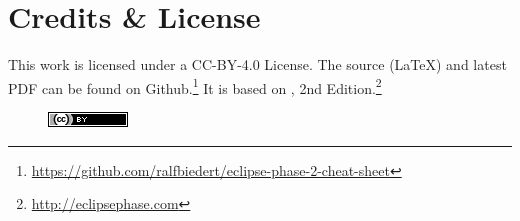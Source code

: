 \section*{Credits \& License}


\begin{itemize}
    \itembox This work is licensed under a CC-BY-4.0 License.
    \itembox The source (LaTeX) and latest PDF can be found on Github.\footnote{\url{https://github.com/ralfbiedert/eclipse-phase-2-cheat-sheet}}
    \itembox It is based on \eclipsephase, 2nd Edition.\footnote{\url{http://eclipsephase.com}}
\end{itemize}



\begin{figure}[H]
    \includegraphics{gfx/license}\\
\end{figure}
